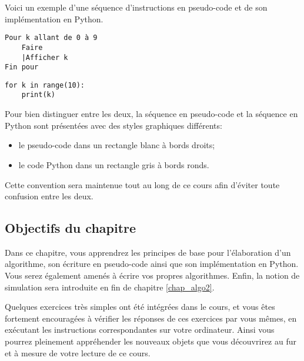 \begin{example}
	Voici un exemple d'une séquence d'instructions en pseudo-code et de son implémentation en Python.
\begin{center}
	\begin{varwidth}[t]{.5\textwidth}
	\begin{lstlisting}[language=Pseudo,linewidth = 6cm]
Pour k allant de 0 à 9
    Faire
    |Afficher k
Fin pour\end{lstlisting}
	\end{varwidth}\hspace{2cm}
\begin{varwidth}[t]{.5\textwidth}
	\begin{lstlisting}[language=iPython,linewidth = 5cm]
for k in range(10):
    print(k)\end{lstlisting}\end{varwidth}\end{center}
	Pour bien distinguer entre les deux, la séquence en pseudo-code et la séquence en Python sont présentées avec des styles graphiques différents: \begin{itemize}
	 	\item le pseudo-code dans un rectangle blanc à bords droits;
	 	\item le code Python dans un rectangle gris à bords ronds.
	 \end{itemize}
Cette convention sera maintenue tout au long de ce cours afin d'éviter toute confusion entre les deux.
\end{example}

\subsection{Objectifs du chapitre}

Dans ce chapitre, vous apprendrez les principes de base pour l'élaboration d'un algorithme, son écriture en pseudo-code ainsi que son implémentation en Python. Vous serez également amenés à écrire vos propres algorithmes. Enfin, la notion de simulation sera introduite en fin de chapitre \ref{chap_algo2}.

 Quelques exercices très simples ont été intégrées dans le cours, et vous êtes fortement encouragées à vérifier les réponses de ces exercices par vous mêmes, en exécutant les instructions correspondantes sur votre ordinateur. Ainsi vous pourrez pleinement appréhender les nouveaux objets que vous découvrirez au fur et à mesure de votre lecture de ce cours.

